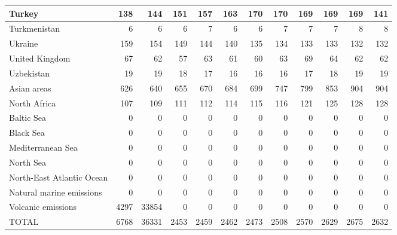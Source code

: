\begin{table}
\begin{tabular}{|l|r|r|r|r|r|r|r|r|r|r|r|}
                        Turkey&    138&    144&    151&    157&    163&    170&    170&    169&    169&    169&    141\\\hline
                  Turkmenistan&      6&      6&      6&      7&      6&      6&      7&      7&      7&      8&      8\\\hline
                       Ukraine&    159&    154&    149&    144&    140&    135&    134&    133&    133&    132&    132\\\hline
                United Kingdom&     67&     62&     57&     63&     61&     60&     63&     69&     64&     62&     62\\\hline
                    Uzbekistan&     19&     19&     18&     17&     16&     16&     16&     17&     18&     19&     19\\\hline
                   Asian areas&    626&    640&    655&    670&    684&    699&    747&    799&    853&    904&    904\\\hline
                  North Africa&    107&    109&    111&    112&    114&    115&    116&    121&    125&    128&    128\\\hline
                    Baltic Sea&      0&      0&      0&      0&      0&      0&      0&      0&      0&      0&      0\\\hline
                     Black Sea&      0&      0&      0&      0&      0&      0&      0&      0&      0&      0&      0\\\hline
             Mediterranean Sea&      0&      0&      0&      0&      0&      0&      0&      0&      0&      0&      0\\\hline
                     North Sea&      0&      0&      0&      0&      0&      0&      0&      0&      0&      0&      0\\\hline
     North-East Atlantic Ocean&      0&      0&      0&      0&      0&      0&      0&      0&      0&      0&      0\\\hline
      Natural marine emissions&      0&      0&      0&      0&      0&      0&      0&      0&      0&      0&      0\\\hline
            Volcanic emissions&   4297&  33854&      0&      0&      0&      0&      0&      0&      0&      0&      0\\\hline\hline
                         TOTAL&   6768&  36331&   2453&   2459&   2462&   2473&   2508&   2570&   2629&   2675&   2632\\\hline
 \end{tabular}
 \end{table}
 
\cleardoublepage
